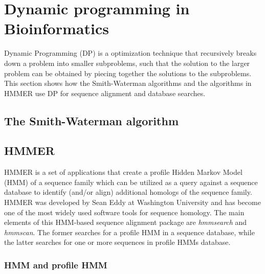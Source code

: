 
\chapter{Dynamic programming in Bioinformatics} %

\label{DynamicProg} %


Dynamic Programming (DP) \citep{BioMach} is a optimization technique that recursively breaks down a problem into smaller subproblems, such that the solution to the larger problem can be obtained by piecing together the solutions to the subproblems. This section shows how the Smith-Waterman algorithms and the algorithms in HMMER use DP for sequence alignment and database searches.


\section{The Smith-Waterman algorithm}



\section{HMMER}

\label{HMMERsect}

HMMER \citep{HMMER} is a set of applications that create a profile Hidden Markov Model (HMM) of a sequence family which can be utilized as a query against a sequence database to identify (and/or align) additional homologs of the sequence family\citep{Seq}. HMMER was developed by Sean Eddy at Washington University and has become one of the most widely used software tools for sequence homology. The main elements of this HMM-based sequence alignment package are \emph{hmmsearch} and \emph{hmmscan}. The former searches for a profile HMM in a sequence database, while the latter searches for one or more sequences in profile HMMs database.

\subsection{HMM and profile HMM}

